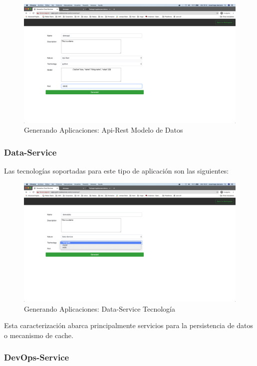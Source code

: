 \documentclass[a4paper,11pt]{book}
\begin{document}
\begin{figure}[H]
\centering
\includegraphics[scale=0.2]{imagenes/casouso/19.png}
\caption{  Generando Aplicaciones: Api-Rest Modelo de Datos  }
\end{figure}

\subsubsection{Data-Service}

Las tecnologías soportadas para este tipo de aplicación son las siguientes: 

\begin{figure}[H]
\centering
\includegraphics[scale=0.2]{imagenes/casouso/20.png}
\caption{  Generando Aplicaciones: Data-Service Tecnología  }
\end{figure}

Esta caracterización abarca principalmente servicios para la persistencia de datos o mecanismo de cache.

\subsubsection{DevOps-Service}
\end{document}
